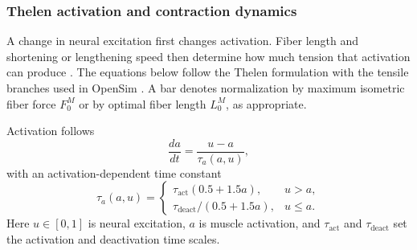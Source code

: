 \subsubsection{Thelen activation and contraction dynamics}

A change in neural excitation first changes activation. Fiber length and shortening or lengthening speed then determine how much tension that activation can produce \citep{thelen_adjustment_2003}. The equations below follow the Thelen formulation with the tensile branches used in OpenSim \citep{opensim_muscle_curves_44}. A bar denotes normalization by maximum isometric fiber force $F_0^M$ or by optimal fiber length $L_0^M$, as appropriate.

Activation follows
\begin{equation}
 \frac{da}{dt}=\frac{u-a}{\tau_a(a,u)},
 \label{eq:app_thelen1}
\end{equation}
with an activation-dependent time constant
\begin{equation}
 \tau_a(a,u)=\begin{cases}
 \tau_{\mathrm{act}}(0.5+1.5a),&u>a,\\
 \tau_{\mathrm{deact}}/(0.5+1.5a),&u\leq a.
 \end{cases}
 \label{eq:app_thelen2}
\end{equation}
Here $u\in[0,1]$ is neural excitation, $a$ is muscle activation, and $\tau_{\mathrm{act}}$ and $\tau_{\mathrm{deact}}$ set the activation and deactivation time scales.

